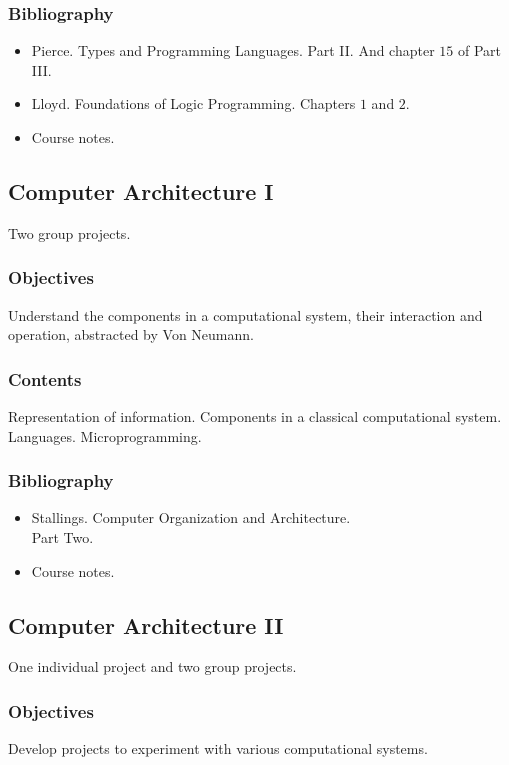 \documentclass[spanish]{article}
\begin{document}
\subsubsection{Bibliography}
\begin{itemize}
  \item Pierce. Types and Programming Languages.
    Part II. And chapter $15$ of Part III.
  \item Lloyd. Foundations of Logic Programming.
    Chapters $1$ and $2$.
  \item Course notes.
\end{itemize}


\hrulefill%

\subsection{Computer Architecture I}
Two group projects.

\subsubsection{Objectives}
Understand the components in a computational system, their interaction and
operation, abstracted by Von Neumann.

\subsubsection{Contents}
Representation of information. Components in a classical computational system.
Languages. Microprogramming.

\subsubsection{Bibliography}
\begin{itemize}
  \item Stallings. Computer Organization and Architecture.\\
    Part Two.
  \item Course notes.
\end{itemize}


\hrulefill%

\subsection{Computer Architecture II}
One individual project and two group projects.

\subsubsection{Objectives}
Develop projects to experiment with various computational systems.
\end{document}

